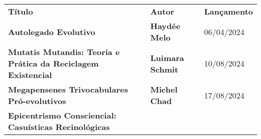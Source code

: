 \documentclass[
]{article}
\begin{document}
\begin{longtable}[]{@{}
  >{\raggedright\arraybackslash}p{}
  >{\raggedright\arraybackslash}p{}
  >{\raggedright\arraybackslash}p{}@{}}
\toprule\noalign{}
\begin{minipage}[b]{\linewidth}\centering
\textbf{Título}
\end{minipage} & \begin{minipage}[b]{\linewidth}\centering
\textbf{Autor}
\end{minipage} & \begin{minipage}[b]{\linewidth}\centering
\textbf{Lançamento}
\end{minipage} \\
\begin{minipage}[b]{\linewidth}\raggedright
\textbf{Autolegado Evolutivo}
\end{minipage} & \begin{minipage}[b]{\linewidth}\raggedright
\textbf{Haydée Melo}
\end{minipage} & \begin{minipage}[b]{\linewidth}\raggedright
06/04/2024
\end{minipage} \\
\begin{minipage}[b]{\linewidth}\raggedright
\textbf{Mutatis Mutandis: Teoria e Prática da Reciclagem Existencial}
\end{minipage} & \begin{minipage}[b]{\linewidth}\raggedright
\textbf{Luimara Schmit}
\end{minipage} & \begin{minipage}[b]{\linewidth}\raggedright
10/08/2024
\end{minipage} \\
\begin{minipage}[b]{\linewidth}\raggedright
\textbf{Megapensenes Trivocabulares Pró-evolutivos}
\end{minipage} & \begin{minipage}[b]{\linewidth}\raggedright
\textbf{Michel Chad}
\end{minipage} & \begin{minipage}[b]{\linewidth}\raggedright
17/08/2024
\end{minipage} \\
\begin{minipage}[b]{\linewidth}\raggedright
\textbf{Epicentrismo Consciencial: Casuísticas Recinológicas}

\end{minipage}
\end{longtable}
\end{document}

